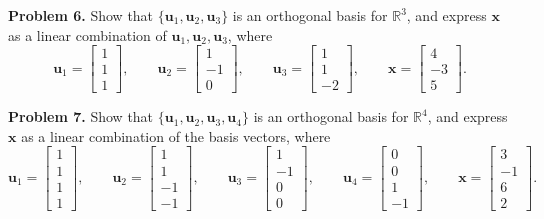 \documentclass[11pt, letterpaper]{article}
\theoremstyle{definition}
\theoremstyle{remark}
\begin{document}
\textbf{Problem 6.} Show that $\{\mathbf{u}_1, \mathbf{u}_2, \mathbf{u}_3\}$ is an orthogonal basis for $\mathbb{R}^3$, and express $\mathbf{x}$ as a linear combination of $\mathbf{u}_1, \mathbf{u}_2, \mathbf{u}_3$, where
\[
\mathbf{u}_1 = \begin{bmatrix} 1 \\ 1 \\ 1 \end{bmatrix}, \qquad
\mathbf{u}_2 = \begin{bmatrix} 1 \\ -1 \\ 0 \end{bmatrix}, \qquad
\mathbf{u}_3 = \begin{bmatrix} 1 \\ 1 \\ -2 \end{bmatrix}, \qquad
\mathbf{x} = \begin{bmatrix} 4 \\ -3 \\ 5 \end{bmatrix}.
\]

\textbf{Problem 7.} Show that $\{\mathbf{u}_1, \mathbf{u}_2, \mathbf{u}_3, \mathbf{u}_4\}$ is an orthogonal basis for $\mathbb{R}^4$, and express $\mathbf{x}$ as a linear combination of the basis vectors, where
\[
\mathbf{u}_1 = \begin{bmatrix} 1 \\ 1 \\ 1 \\ 1 \end{bmatrix}, \qquad
\mathbf{u}_2 = \begin{bmatrix} 1 \\ 1 \\ -1 \\ -1 \end{bmatrix}, \qquad
\mathbf{u}_3 = \begin{bmatrix} 1 \\ -1 \\ 0 \\ 0 \end{bmatrix}, \qquad
\mathbf{u}_4 = \begin{bmatrix} 0 \\ 0 \\ 1 \\ -1 \end{bmatrix}, \qquad
\mathbf{x} = \begin{bmatrix} 3 \\ -1 \\ 6 \\ 2 \end{bmatrix}.
\]
\end{document}
